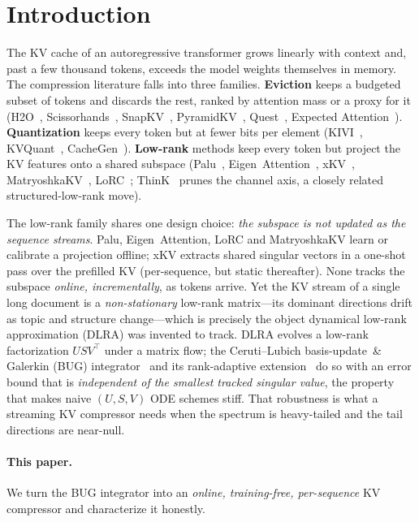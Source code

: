 \documentclass[11pt]{article}
\begin{document}
\section{Introduction}
\label{sec:intro}

The KV cache of an autoregressive transformer grows linearly with context and,
past a few thousand tokens, exceeds the model weights themselves in memory. The
compression literature falls into three families. \textbf{Eviction} keeps a
budgeted subset of tokens and discards the rest, ranked by attention mass or a
proxy for it (H2O~\citep{zhang2023h2o}, Scissorhands~\citep{liu2023scissorhands},
SnapKV~\citep{li2024snapkv}, PyramidKV~\citep{cai2024pyramidkv},
Quest~\citep{tang2024quest}, Expected Attention~\citep{devoto2025expected}).
\textbf{Quantization} keeps every token but at fewer bits per element
(KIVI~\citep{liu2024kivi}, KVQuant~\citep{hooper2024kvquant},
CacheGen~\citep{liu2024cachegen}). \textbf{Low-rank} methods keep every token but
project the KV features onto a shared subspace
(Palu~\citep{chang2025palu}, Eigen~Attention~\citep{saxena2024eigen},
xKV~\citep{chang2025xkv}, MatryoshkaKV~\citep{lin2025matryoshkakv},
LoRC~\citep{zhang2024lorc}; ThinK~\citep{xu2024think} prunes the channel axis, a
closely related structured-low-rank move).

The low-rank family shares one design choice: \emph{the subspace is not updated
as the sequence streams}. Palu, Eigen~Attention, LoRC and MatryoshkaKV learn or
calibrate a projection offline; xKV extracts shared singular vectors in a
one-shot pass over the prefilled KV (per-sequence, but static thereafter). None
tracks the subspace \emph{online, incrementally}, as tokens arrive. Yet the KV
stream of a single long document is a
\emph{non-stationary} low-rank matrix---its dominant directions drift as topic
and structure change---which is precisely the object dynamical low-rank
approximation (DLRA) was invented to track. DLRA evolves a low-rank
factorization $U S V^\top$ under a matrix flow; the Ceruti--Lubich
basis-update~\& Galerkin (BUG) integrator~\citep{ceruti2022unconventional} and
its rank-adaptive extension~\citep{ceruti2022rankadaptive} do so with an error
bound that is \emph{independent of the smallest tracked singular value}, the
property that makes naive $(U,S,V)$ ODE schemes stiff. That robustness is what a
streaming KV compressor needs when the spectrum is heavy-tailed and the tail
directions are near-null.

\paragraph{This paper.} We turn the BUG integrator into an \emph{online,
training-free, per-sequence} KV compressor and characterize it honestly.
\end{document}

